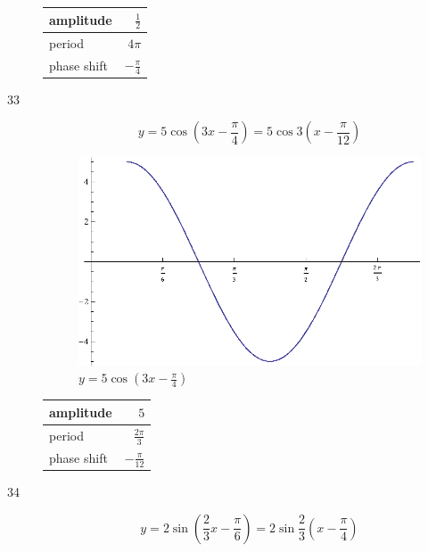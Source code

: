 \documentclass{exam}
\begin{document}
\begin{description}
        \begin{tabular}[H]{lr}
          \toprule
          amplitude & $\frac{1}{2}$ \\
          \midrule
          period & $4 \pi$ \\
          \midrule
          phase shift & $- \frac{\pi}{4}$ \\
          \bottomrule
        \end{tabular}

      \item[33]
        \[
          y = 5 \cos \left( 3x - \frac{\pi}{4} \right) = 5 \cos 3 \left( x - \frac{\pi}{12} \right)
        \]

        \begin{figure}[H]
          \centering
          \includegraphics[scale=0.8]{exercise33.eps}
          \caption{$y = 5 \cos \left( 3x - \frac{\pi}{4} \right)$}
        \end{figure}

        \begin{tabular}[H]{lr}
          \toprule
          amplitude & $5$ \\
          \midrule
          period & $\frac{2 \pi}{3}$ \\
          \midrule
          phase shift & $- \frac{\pi}{12}$ \\
          \bottomrule
        \end{tabular}

      \pagebreak

      \item[34]
        \[
          y = 2 \sin \left( \frac{2}{3} x - \frac{\pi}{6} \right) = 2 \sin \frac{2}{3} \left( x - \frac{\pi}{4} \right)
        \]


\end{description}
\end{document}

